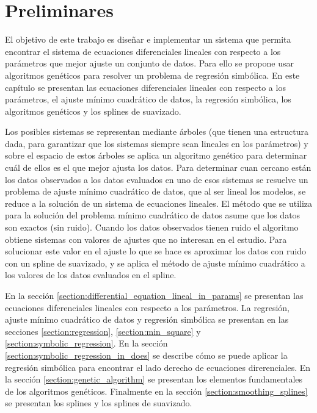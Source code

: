 \chapter{Preliminares}\label{chapter:preliminaries}

El objetivo de este trabajo es diseñar e implementar un sistema que permita encontrar el sistema de ecuaciones diferenciales lineales con respecto a los parámetros que mejor ajuste un conjunto de datos. Para ello se propone usar algoritmos genéticos para resolver un problema de regresión simbólica. En este capítulo se presentan las ecuaciones diferenciales lineales con respecto a los parámetros, el ajuste mínimo cuadrático de datos, la regresión simbólica, los algoritmos genéticos y los splines de suavizado.

Los posibles sistemas se representan mediante árboles (que tienen una estructura dada, para garantizar que los sistemas siempre sean lineales en los parámetros) y sobre el espacio de estos árboles se aplica un algoritmo genético para determinar cuál de ellos es el que mejor ajusta los datos. Para determinar cuan cercano están los datos observados a los datos evaluados en uno de esos sistemas se resuelve un problema de ajuste mínimo cuadrático de datos, que al ser lineal los modelos, se reduce a la solución de un sistema de ecuaciones lineales. El método que se utiliza para la solución del problema mínimo cuadrático de datos asume que los datos son exactos (sin ruido). Cuando los datos observados tienen ruido el algoritmo obtiene sistemas con valores de ajustes que no interesan en el estudio. Para solucionar este valor en el ajuste lo que se hace es aproximar los datos con ruido con un spline de suavizado, y se aplica el método de ajuste mínimo cuadrático a los valores de los datos evaluados en el spline.

En la sección \ref{section:differential_equation_lineal_in_params} se presentan las ecuaciones diferenciales lineales con respecto a los parámetros. La regresión, ajuste mínimo cuadrático de datos y regresión simbólica se presentan en las secciones \ref{section:regression}, \ref{section:min_square} y \ref{section:symbolic_regression}. En la sección \ref{section:symbolic_regression_in_does} se describe cómo se puede aplicar la regresión simbólica para encontrar el lado derecho de ecuaciones direrenciales. En la sección \ref{section:genetic_algorithm} se presentan los elementos fundamentales de los algoritmos genéticos. Finalmente en la sección \ref{section:smoothing_splines} se presentan los splines y los splines de suavizado.

